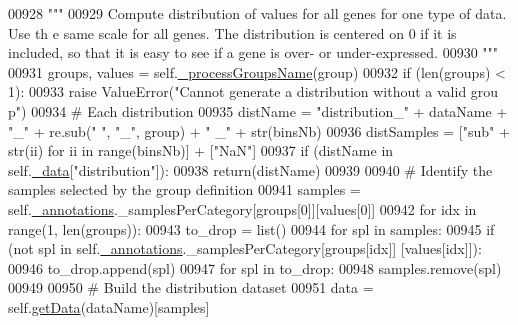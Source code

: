 \begin{DoxyCode}
00928         \textcolor{stringliteral}{"""}
00929 \textcolor{stringliteral}{        Compute distribution of values for all genes for one type of data. Use th
      e same scale for all genes. The distribution is centered on 0 if it is included, 
      so that it is easy to see if a gene is over- or under-expressed.}
00930 \textcolor{stringliteral}{        """}
00931         groups, values = self.\hyperlink{classnavicom_1_1navicom_1_1NaviCom_a1b8f14be167905533ab7e18294dd9100}{_processGroupsName}(group)
00932         \textcolor{keywordflow}{if} (len(groups) < 1):
00933             \textcolor{keywordflow}{raise} ValueError(\textcolor{stringliteral}{"Cannot generate a distribution without a valid grou
      p"})
00934         \textcolor{comment}{# Each distribution }
00935         distName = \textcolor{stringliteral}{"distribution\_"} + dataName + \textcolor{stringliteral}{"\_"} + re.sub(\textcolor{stringliteral}{" "}, \textcolor{stringliteral}{"\_"}, group) + \textcolor{stringliteral}{"
      \_"} + str(binsNb)
00936         distSamples = [\textcolor{stringliteral}{"sub"} + str(ii) \textcolor{keywordflow}{for} ii \textcolor{keywordflow}{in} range(binsNb)] + [\textcolor{stringliteral}{"NaN"}]
00937         \textcolor{keywordflow}{if} (distName \textcolor{keywordflow}{in} self.\hyperlink{classnavicom_1_1navicom_1_1NaviCom_a407b2b5c30a5652ee85c4be54b3e6679}{_data}[\textcolor{stringliteral}{"distribution"}]):
00938             \textcolor{keywordflow}{return}(distName)
00939 
00940         \textcolor{comment}{# Identify the samples selected by the group definition}
00941         samples = self.\hyperlink{classnavicom_1_1navicom_1_1NaviCom_afb88722efeb86813dcb85818b7065330}{_annotations}.\_samplesPerCategory[groups[0]][values[0]]
00942         \textcolor{keywordflow}{for} idx \textcolor{keywordflow}{in} range(1, len(groups)):
00943             to\_drop = list()
00944             \textcolor{keywordflow}{for} spl \textcolor{keywordflow}{in} samples:
00945                 \textcolor{keywordflow}{if} (\textcolor{keywordflow}{not} spl \textcolor{keywordflow}{in} self.\hyperlink{classnavicom_1_1navicom_1_1NaviCom_afb88722efeb86813dcb85818b7065330}{_annotations}.\_samplesPerCategory[groups[idx]]
      [values[idx]]):
00946                     to\_drop.append(spl)
00947             \textcolor{keywordflow}{for} spl \textcolor{keywordflow}{in} to\_drop:
00948                 samples.remove(spl)
00949 
00950         \textcolor{comment}{# Build the distribution dataset}
00951         data = self.\hyperlink{classnavicom_1_1navicom_1_1NaviCom_ad675e899836271ff4f2fd4bd17ea81d9}{getData}(dataName)[samples]

\end{DoxyCode}
